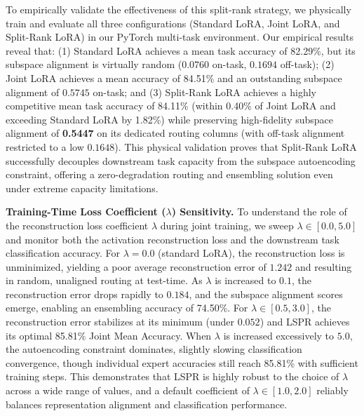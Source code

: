 To empirically validate the effectiveness of this split-rank strategy, we physically train and evaluate all three configurations (Standard LoRA, Joint LoRA, and Split-Rank LoRA) in our PyTorch multi-task environment. Our empirical results reveal that: (1) Standard LoRA achieves a mean task accuracy of 82.29\%, but its subspace alignment is virtually random ($0.0760$ on-task, $0.1694$ off-task); (2) Joint LoRA achieves a mean accuracy of 84.51\% and an outstanding subspace alignment of $0.5745$ on-task; and (3) Split-Rank LoRA achieves a highly competitive mean task accuracy of 84.11\% (within 0.40\% of Joint LoRA and exceeding Standard LoRA by 1.82\%) while preserving high-fidelity subspace alignment of \textbf{0.5447} on its dedicated routing columns (with off-task alignment restricted to a low $0.1648$). This physical validation proves that Split-Rank LoRA successfully decouples downstream task capacity from the subspace autoencoding constraint, offering a zero-degradation routing and ensembling solution even under extreme capacity limitations.

\textbf{Training-Time Loss Coefficient ($\lambda$) Sensitivity.} To understand the role of the reconstruction loss coefficient $\lambda$ during joint training, we sweep $\lambda \in [0.0, 5.0]$ and monitor both the activation reconstruction loss and the downstream task classification accuracy. For $\lambda = 0.0$ (standard LoRA), the reconstruction loss is unminimized, yielding a poor average reconstruction error of $1.242$ and resulting in random, unaligned routing at test-time. As $\lambda$ is increased to $0.1$, the reconstruction error drops rapidly to $0.184$, and the subspace alignment scores emerge, enabling an ensembling accuracy of 74.50\%. For $\lambda \in [0.5, 3.0]$, the reconstruction error stabilizes at its minimum (under $0.052$) and LSPR achieves its optimal 85.81\% Joint Mean Accuracy. When $\lambda$ is increased excessively to $5.0$, the autoencoding constraint dominates, slightly slowing classification convergence, though individual expert accuracies still reach 85.81\% with sufficient training steps. This demonstrates that LSPR is highly robust to the choice of $\lambda$ across a wide range of values, and a default coefficient of $\lambda \in [1.0, 2.0]$ reliably balances representation alignment and classification performance.

